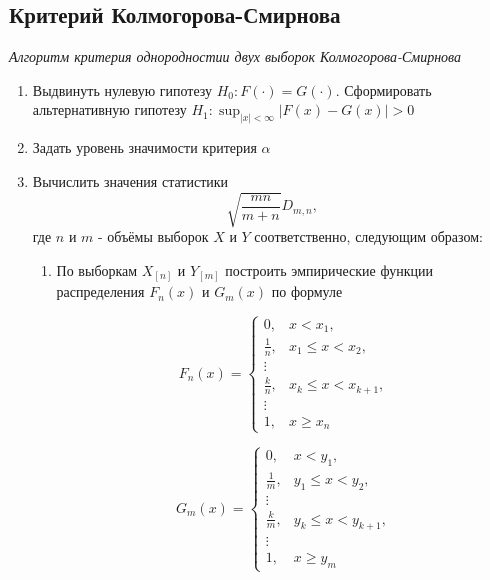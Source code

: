 \subsection{Критерий Колмогорова-Смирнова}

\textit{Алгоритм критерия однородностии двух выборок Колмогорова-Смирнова}

\begin{enumerate}
	\item Выдвинуть нулевую гипотезу $H_0: F(\cdot) = G(\cdot)$. Сформировать альтернативную гипотезу $H_1: \sup_{|x| < \infty} | F(x) - G(x) | > 0$
	\item Задать уровень значимости критерия $\alpha$
	\item Вычислить значения статистики
	\begin{equation}\label{main_stat}
		\sqrt{\frac{mn}{m+n}}D_{m,n},
	\end{equation}
	где $n$ и $m$ - объёмы выборок $X$ и $Y$ соответственно, следующим образом:
	
	\begin{enumerate}
		\item По выборкам $X_{[n]}$ и $Y_{[m]}$ построить эмпирические функции распределения $F_n(x)$ и $G_m(x)$ по формуле
		
		\begin{equation}\label{ecdfx}
			F_n(x) = \left\{
			\begin{matrix}
				0, & x < x_1, \\
				\frac{1}{n}, & x_1 \leq x < x_2, \\
				\vdots & \\
				\frac{k}{n}, & x_k \leq x < x_{k+1}, \\
				\vdots & \\
				1, & x \geq x_n
			\end{matrix}
			\right.
		\end{equation}
		
		\begin{equation}\label{ecdfy}
			G_m(x) = \left\{
			\begin{matrix}
				0, & x < y_1, \\
				\frac{1}{m}, & y_1 \leq x < y_2, \\
				\vdots & \\
				\frac{k}{m}, &y_k \leq x < y_{k+1}, \\
				\vdots & \\
				1, & x \geq y_m
			\end{matrix}
			\right.
		\end{equation}
		

\end{enumerate}
\end{enumerate}
